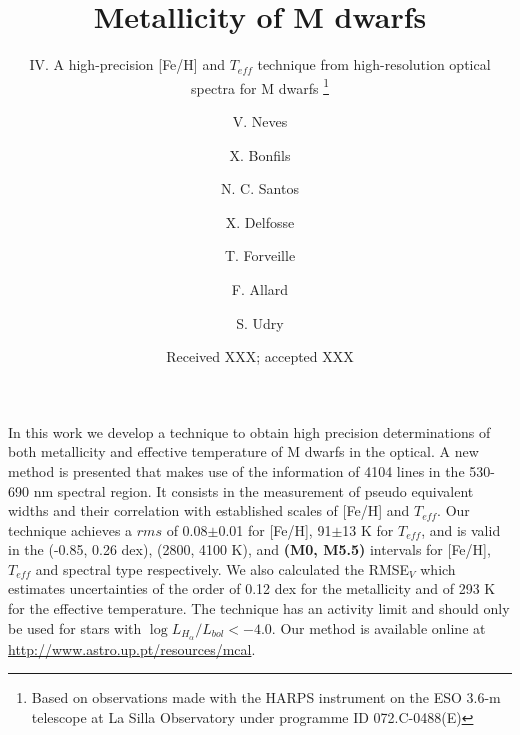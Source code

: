\documentclass[referee]{aa}
\begin{document}
 


   \title{Metallicity of M dwarfs }

  \subtitle{IV. A high-precision [Fe/H] and $T_{eff}$ technique from high-resolution optical spectra for M dwarfs \thanks{Based on observations made with the HARPS instrument on the ESO 3.6-m telescope at La Silla Observatory under programme ID 072.C-0488(E)}}

\author{ V. Neves \and X. Bonfils \and
  N. C. Santos \and X. Delfosse \and
  T. Forveille  \and F. Allard  \and
  S. Udry}

   \date{Received XXX; accepted XXX}

 
  \abstract
{}
   {In this work we develop a technique to obtain high precision determinations of both metallicity and effective temperature of M dwarfs in the optical.}
   {A new method is presented that makes use of the information of 4104 lines in the 530-690 nm spectral region. It consists in the measurement of pseudo equivalent widths and their correlation with established scales of [Fe/H] and $T_{eff}$.}
   {Our technique achieves a $rms$ of 0.08$\pm$0.01 for [Fe/H], 91$\pm$13 K for $T_{eff}$, and is valid in the (-0.85, 0.26 dex), (2800, 4100 K), and \textbf{(M0, M5.5)} intervals for [Fe/H], $T_{eff}$ and spectral type respectively. We also calculated the RMSE$_{V}$ which estimates uncertainties of the order of 0.12 dex for the metallicity and of 293 K for the effective temperature. The technique has an activity limit and should only be used for stars with  $\log{L_{H_{\alpha}}/L_{bol}} < -4.0$. Our method is available online at \url{http://www.astro.up.pt/resources/mcal}.  }
   {}
\end{document}
